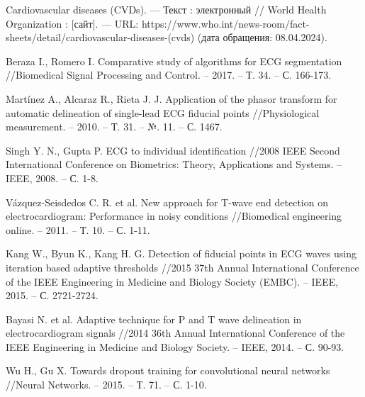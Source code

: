 \begin{thebibliography}{00}
	Cardiovascular diseases (CVDs). --- Текст : электронный // World Health
	Organization : [сайт]. --- URL:
	https://www.who.int/news-room/fact-sheets/detail/cardiovascular-diseases-(cvds)
	(дата обращения: 08.04.2024).

	Beraza I., Romero I. Comparative study of algorithms for ECG segmentation
	//Biomedical Signal Processing and Control. – 2017. – Т. 34. – С. 166-173.

	Martínez A., Alcaraz R., Rieta J. J. Application of the phasor transform
	for automatic delineation of single-lead ECG fiducial points
	//Physiological measurement. – 2010. – Т. 31. – №. 11. – С. 1467.

	Singh Y. N., Gupta P. ECG to individual identification //2008 IEEE Second
	International Conference on Biometrics: Theory, Applications and Systems. –
	IEEE, 2008. – С. 1-8.

	Vázquez-Seisdedos C. R. et al. New approach for T-wave end detection on
	electrocardiogram: Performance in noisy conditions //Biomedical engineering
	online. – 2011. – Т. 10. – С. 1-11.

	Kang W., Byun K., Kang H. G. Detection of fiducial points in ECG waves
	using iteration based adaptive thresholds //2015 37th Annual International
	Conference of the IEEE Engineering in Medicine and Biology Society (EMBC).
	– IEEE, 2015. – С. 2721-2724.

	Bayasi N. et al. Adaptive technique for P and T wave delineation in
	electrocardiogram signals //2014 36th Annual International Conference of
	the IEEE Engineering in Medicine and Biology Society. – IEEE, 2014. – С.
	90-93.

	Wu H., Gu X. Towards dropout training for convolutional neural networks
	//Neural Networks. – 2015. – Т. 71. – С. 1-10.

\end{thebibliography}
\endgroup
